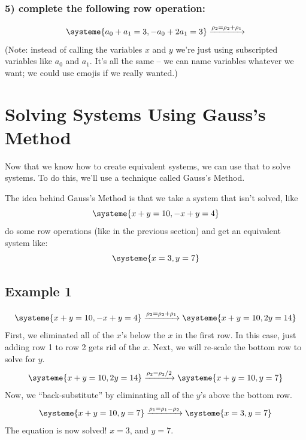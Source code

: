 \documentclass[a4paper,twoside,12pt]{memoir}  %
\begin{document}
\subsubsection{5) complete the following row operation:}
\begin{equation*}
  \systeme{
    a_0 + a_1 = 3,
   -a_0 + 2a_1 = 3
  }
  \xrightarrow{\rho_2 = \rho_2 + \rho_1}
\end{equation*}
(Note: instead of calling the variables $x$ and $y$ we're just using subscripted variables like $a_0$ and $a_1$. It's all the same -- we can name variables whatever we want; we could use emojis if we really wanted.)

\section{Solving Systems Using Gauss's Method}
Now that we know how to create equivalent systems, we can use that to solve systems.
To do this, we'll use a technique called Gauss's Method.

The idea behind Gauss's Method is that we take a system that isn't solved, like
\begin{equation*}
  \systeme{
    x + y = 10,
   -x + y = 4
  }
\end{equation*}
do some row operations (like in the previous section) and get an equivalent system like:
\begin{equation*}
  \systeme{
    x = 3,
    y = 7
  }
\end{equation*}

\subsection{Example 1}
\begin{equation*}
  \systeme{
    x + y = 10,
   -x + y = 4
  }
  \xrightarrow{\rho_2 = \rho_2 + \rho_1}
  \systeme{
    x + y = 10,
       2y = 14
  }
\end{equation*}
First, we eliminated all of the $x$'s below the $x$ in the first row.
In this case, just adding row 1 to row 2 gets rid of the $x$.
Next, we will re-scale the bottom row to solve for $y$.
\begin{equation*}
  \systeme{
    x + y = 10,
       2y = 14
  }
  \xrightarrow{\rho_2 = \rho_2/2}
  \systeme{
    x + y = 10,
        y = 7
  }
\end{equation*}
Now, we ``back-substitute'' by eliminating all of the $y$'s above the bottom row.
\begin{equation*}
  \systeme{
    x + y = 10,
        y = 7
  }
  \xrightarrow{\rho_1 = \rho_1 - \rho_2}
  \systeme{
    x     = 3,
        y = 7
  }
\end{equation*}
The equation is now solved! $x=3$, and $y=7$.
\end{document}
